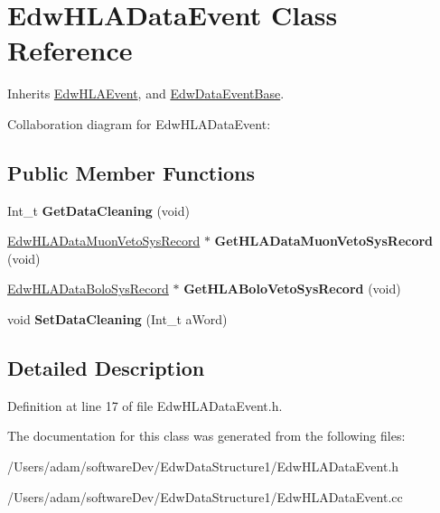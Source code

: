 \hypertarget{class_edw_h_l_a_data_event}{
\section{EdwHLADataEvent Class Reference}
\label{class_edw_h_l_a_data_event}
}


Inherits \hyperlink{class_edw_h_l_a_event}{EdwHLAEvent}, and \hyperlink{class_edw_data_event_base}{EdwDataEventBase}.



Collaboration diagram for EdwHLADataEvent:\subsection*{Public Member Functions}
\begin{DoxyCompactItemize}
\item 
\hypertarget{class_edw_h_l_a_data_event_ad654d01b09cf35467a0478413f96ff47}{
Int\_\-t {\bfseries GetDataCleaning} (void)}
\label{class_edw_h_l_a_data_event_ad654d01b09cf35467a0478413f96ff47}

\item 
\hypertarget{class_edw_h_l_a_data_event_a1dd9d2d09577a8a23bb97de3674c044c}{
\hyperlink{class_edw_h_l_a_data_muon_veto_sys_record}{EdwHLADataMuonVetoSysRecord} $\ast$ {\bfseries GetHLADataMuonVetoSysRecord} (void)}
\label{class_edw_h_l_a_data_event_a1dd9d2d09577a8a23bb97de3674c044c}

\item 
\hypertarget{class_edw_h_l_a_data_event_ac66e37b5255257734ede4515e5af1004}{
\hyperlink{class_edw_h_l_a_data_bolo_sys_record}{EdwHLADataBoloSysRecord} $\ast$ {\bfseries GetHLABoloVetoSysRecord} (void)}
\label{class_edw_h_l_a_data_event_ac66e37b5255257734ede4515e5af1004}

\item 
\hypertarget{class_edw_h_l_a_data_event_a50fc9fb27782a0fef6e191e3024993bd}{
void {\bfseries SetDataCleaning} (Int\_\-t aWord)}
\label{class_edw_h_l_a_data_event_a50fc9fb27782a0fef6e191e3024993bd}

\end{DoxyCompactItemize}


\subsection{Detailed Description}


Definition at line 17 of file EdwHLADataEvent.h.



The documentation for this class was generated from the following files:\begin{DoxyCompactItemize}
\item 
/Users/adam/softwareDev/EdwDataStructure1/EdwHLADataEvent.h\item 
/Users/adam/softwareDev/EdwDataStructure1/EdwHLADataEvent.cc\end{DoxyCompactItemize}
